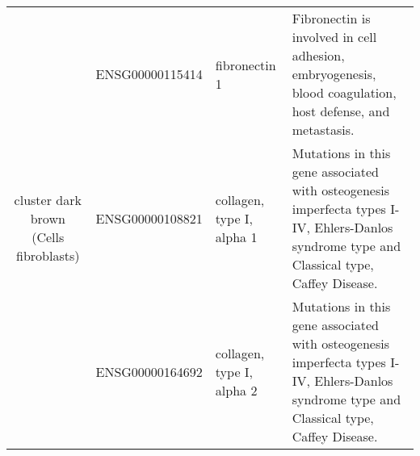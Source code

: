 \begin{table}
\begin{center}
\begin{tabular}{|c|c|p{1.9in}|p{2.5in}|}
 \hline
 \multirow{3}{4em}{cluster dark brown (Cells fibroblasts)} & ENSG00000115414 & fibronectin 1 & \small{Fibronectin is involved in cell adhesion, embryogenesis, blood coagulation, host defense, and metastasis.} \\
 					      & ENSG00000108821 & collagen, type I, alpha 1 & \small{Mutations in this gene associated with osteogenesis imperfecta types I-IV, Ehlers-Danlos syndrome type and Classical type, Caffey Disease}. \\
					      & ENSG00000164692 & collagen, type I, alpha 2 & \small{Mutations in this gene associated with osteogenesis imperfecta types I-IV, Ehlers-Danlos syndrome type and Classical type, Caffey Disease}. \\
\hline	
 \end{tabular}
 \end{center}
\end{table}





